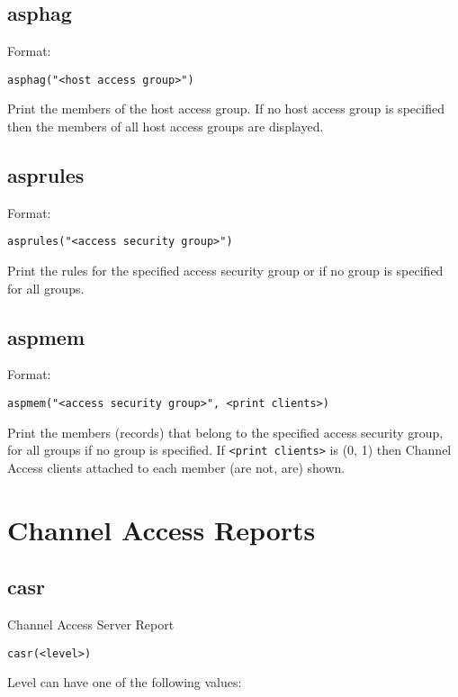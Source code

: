 \subsection{asphag}

Format:

\begin{verbatim}asphag("<host access group>")
\end{verbatim}Print the members of the host access group.  If no host access group is specified then the members of all host access 
groups are displayed.

\subsection{asprules}

Format:

\begin{verbatim}asprules("<access security group>")
\end{verbatim}Print the rules for the specified access security group or if no group is specified for all groups.

\subsection{aspmem}

Format:

\begin{verbatim}aspmem("<access security group>", <print clients>)
\end{verbatim}Print the members (records) that belong to the specified access security group, for all groups if no group is specified.  If 
\verb|<print clients>| is (0, 1) then Channel Access clients attached to each member (are not, are) shown.

\section{Channel Access Reports}

\subsection{casr}

Channel Access Server Report

\begin{verbatim}casr(<level>)
\end{verbatim}Level can have one of the following values:


